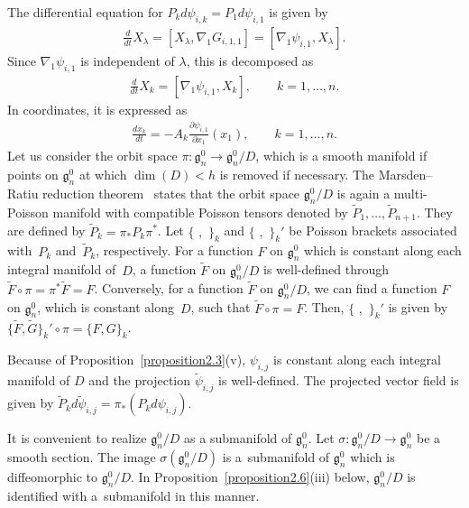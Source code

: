\documentclass[10pt,a4paper]{amsart}
\numberwithin{equation}{section}
\begin{document}
The dif\/ferential equation for $P_kd\psi_{i,k} = P_1d\psi_{i,1}$ is given by
\begin{gather*}
\frac{d}{dt}X_\lambda = [X_\lambda , \nabla _1G_{i,1,1}] = [\nabla _1 \psi_{i,1}, X_\lambda ].
\end{gather*}
Since $\nabla _1 \psi_{i,1}$ is independent of $\lambda $, this is decomposed as
\begin{gather*}
\frac{d}{dt}X_k = [\nabla _1\psi_{i,1}, X_k], \qquad k=1,\dots ,n.
\end{gather*}
In coordinates, it is expressed as
\begin{gather}
\frac{dx_k}{dt} = -A_k \frac{\partial \psi_{i,1}}{\partial x_1}(x_1), \qquad k=1,\dots ,n.\label{D}
\end{gather}
Let us consider the orbit space $\pi \colon \mathfrak{g}^0_n \to \mathfrak{g}^0_n/D$, which is a smooth manifold if points on $\mathfrak{g}^0_n$ at which $\dim (D) < h$ is removed if necessary. The Marsden--Ratiu reduction theorem~\cite{Mag1} states that the orbit space $\mathfrak{g}^0_n/D$ is again a multi-Poisson manifold with compatible Poisson tensors denoted by $\widetilde{P}_1, \dots ,\widetilde{P}_{n+1}$. They are def\/ined by $\widetilde{P}_k = \pi_* P_k\pi^*$. Let $\{ \,\, , \,\, \}_k$ and $\{ \,\, ,\,\,\}_k'$ be Poisson brackets associated with~$P_k$ and~$\widetilde{P}_k$, respectively. For a function $F$ on $\mathfrak{g}^0_n$ which is constant along each integral manifold of~$D$, a function $\widetilde{F}$ on $\mathfrak{g}^0_n/D$ is well-def\/ined through $\widetilde{F} \circ \pi = \pi^* \widetilde{F} = F$. Conversely, for a function $\widetilde{F}$ on $\mathfrak{g}^0_n/D$, we can f\/ind a function $F$ on $\mathfrak{g}^0_n$, which is constant along~$D$, such that $\widetilde{F}\circ \pi = F$. Then, $\{ \,\, ,\,\,\}_k'$ is given by $\{ \widetilde{F}, \widetilde{G}\}_k' \circ \pi = \{ F, G\}_k$.

Because of Proposition~\ref{proposition2.3}(v), $\psi_{i,j}$ is constant along each integral manifold of $D$ and the projection $\widetilde{\psi}_{i,j}$ is well-def\/ined. The projected vector f\/ield is given by $\widetilde{P}_kd\widetilde{\psi}_{i,j} = \pi_* (P_kd\psi_{i,j})$.

It is convenient to realize $\mathfrak{g}^0_n/D$ as a submanifold of $\mathfrak{g}^0_n$. Let $\sigma \colon \mathfrak{g}^0_n/D \to \mathfrak{g}^0_n$ be a smooth section. The image $\sigma (\mathfrak{g}^0_n/D)$ is a~submanifold of $\mathfrak{g}^0_n$ which is dif\/feomorphic to $\mathfrak{g}^0_n/D$.
In Proposition~\ref{proposition2.6}(iii) below, $\mathfrak{g}^0_n/D$ is identif\/ied with a~submanifold in this manner.
\end{document}
